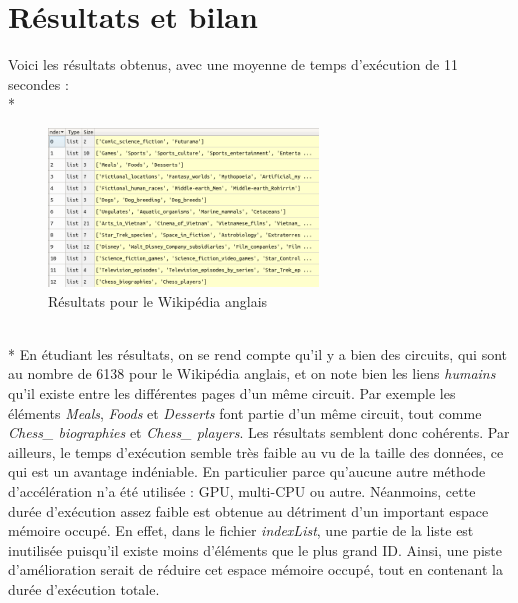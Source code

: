 \documentclass{article}
\begin{document}
\section{R\'{e}sultats et bilan}

Voici les r\'{e}sultats obtenus, avec une moyenne de temps d'ex\'{e}cution de 11 secondes :
\\*
\begin{figure}[h]
\begin{center}
\includegraphics[width=0.64\textwidth]{consoleResultat}
\caption{R\'{e}sultats pour le Wikip\'{e}dia anglais}
\end{center}
\end{figure}
~\\*
En \'{e}tudiant les r\'{e}sultats, on se rend compte qu'il y a bien des circuits, qui sont au nombre de 6138 pour le Wikip\'{e}dia anglais, et on note bien les liens \textit{humains} qu'il existe entre les diff\'{e}rentes pages d'un m\^{e}me circuit. Par exemple les \'{e}l\'{e}ments \textit{Meals}, \textit{Foods} et \textit{Desserts} font partie d'un m\^{e}me circuit, tout comme \textit{Chess\_ biographies} et \textit{Chess\_ players}. Les r\'{e}sultats semblent donc coh\'{e}rents. Par ailleurs, le temps d'ex\'{e}cution semble tr\`{e}s faible au vu de la taille des donn\'{e}es, ce qui est un avantage ind\'{e}niable. En particulier parce qu'aucune autre m\'{e}thode d'acc\'{e}l\'{e}ration n'a \'{e}t\'{e} utilis\'{e}e : GPU, multi-CPU ou autre. N\'{e}anmoins, cette dur\'{e}e d'ex\'{e}cution assez faible est obtenue au d\'{e}triment d'un important espace m\'{e}moire occup\'{e}. En effet, dans le fichier \textit{indexList}, une partie de la liste est inutilis\'{e}e puisqu'il existe moins d'\'{e}l\'{e}ments que le plus grand ID. Ainsi, une piste d'am\'{e}lioration serait de r\'{e}duire cet espace m\'{e}moire occup\'{e}, tout en contenant la dur\'{e}e d'ex\'{e}cution totale.
\end{document}
